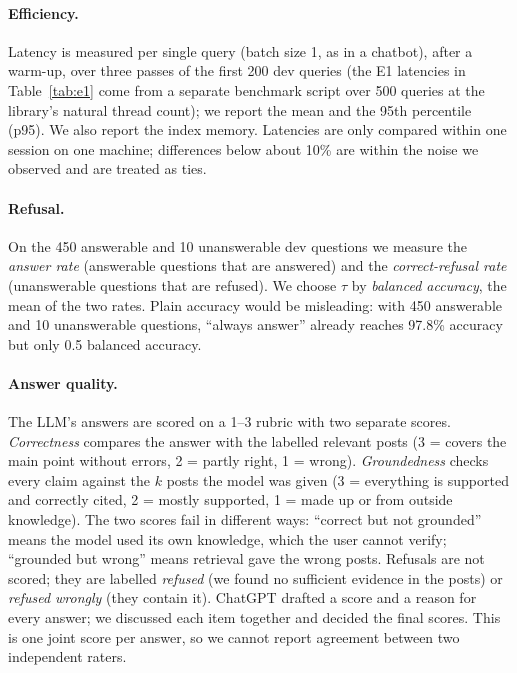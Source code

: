 \documentclass[11pt]{article}
\begin{document}
\paragraph{Efficiency.} Latency is measured per single query (batch size 1, as in a chatbot), after a warm-up, over
three passes of the first 200 dev queries (the E1 latencies in Table~\ref{tab:e1} come from a separate benchmark
script over 500 queries at the library's natural thread count); we report the mean and the 95th percentile (p95). We also report the index memory.
Latencies are only compared within one session on one machine; differences below about 10\% are within the noise
we observed and are treated as ties.

\paragraph{Refusal.} On the 450 answerable and 10 unanswerable dev questions we measure the \emph{answer rate}
(answerable questions that are answered) and the \emph{correct-refusal rate} (unanswerable questions that are
refused). We choose $\tau$ by \emph{balanced accuracy}, the mean of the two rates. Plain accuracy would be
misleading: with 450 answerable and 10 unanswerable questions, ``always answer'' already reaches 97.8\% accuracy
but only 0.5 balanced accuracy.

\paragraph{Answer quality.} The LLM's answers are scored on a 1--3 rubric with two separate scores.
\emph{Correctness} compares the answer with the labelled relevant posts (3 = covers the main point without errors,
2 = partly right, 1 = wrong). \emph{Groundedness} checks every claim against the $k$ posts the model was given
(3 = everything is supported and correctly cited, 2 = mostly supported, 1 = made up or from outside knowledge).
The two scores fail in different ways: ``correct but not grounded'' means the model used its own knowledge, which
the user cannot verify; ``grounded but wrong'' means retrieval gave the wrong posts. Refusals are not scored; they
are labelled \emph{refused} (we found no sufficient evidence in the posts) or \emph{refused wrongly} (they contain it). ChatGPT
drafted a score and a reason for every answer; we discussed each item together and decided the final scores. This
is one joint score per answer, so we cannot report agreement between two independent raters.
\end{document}
